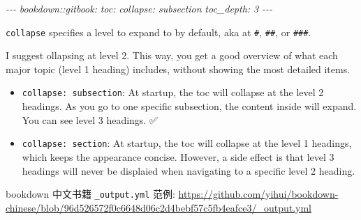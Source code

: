 \documentclass[
  a4paper,
  twoside,
  openright]{book}
\newenvironment{Shaded}{\begin{snugshade}}{\end{snugshade}}
\newcommand{\CommentTok}[1]{\textcolor[rgb]{0.56,0.35,0.01}{\textit{#1}}}
\providecommand{\tightlist}{%
  \setlength{\itemsep}{0pt}\setlength{\parskip}{0pt}}
\theoremstyle{definition}
\theoremstyle{definition}
\theoremstyle{definition}
\theoremstyle{definition}
\theoremstyle{remark}
\begin{document}
\begin{itemize}
\begin{Shaded}
\begin{Highlighting}[]
\CommentTok{{-}{-}{-}}
\CommentTok{bookdown::gitbook:}
\CommentTok{    toc:}
\CommentTok{        collapse: subsection}
\CommentTok{    toc\_depth: 3}
\CommentTok{{-}{-}{-}}
\end{Highlighting}
\end{Shaded}

  \texttt{collapse} specifies a level to expand to by default, aka at \texttt{\#}, \texttt{\#\#}, or \texttt{\#\#\#}.

  I suggest ollapsing at level 2. This way, you get a good overview of what each major topic (level 1 heading) includes, without showing the most detailed items.

  \begin{itemize}
  \tightlist
  \item
    \texttt{collapse:\ subsection}: At startup, the toc will collapse at the level 2 headings. As you go to one specific subsection, the content inside will expand. You can see level 3 headings. ✅
  \item
    \texttt{collapse:\ section}: At startup, the toc will collapse at the level 1 headings, which keeps the appearance concise. However, a side effect is that level 3 headings will never be displaied when navigating to a specific level 2 heading.
  \end{itemize}
\end{itemize}

bookdown 中文书籍 \texttt{\_output.yml} 范例: \url{https://github.com/yihui/bookdown-chinese/blob/96d526572f0c6648d06c2d4bebf57c5fb4eafce3/_output.yml}
\end{document}
